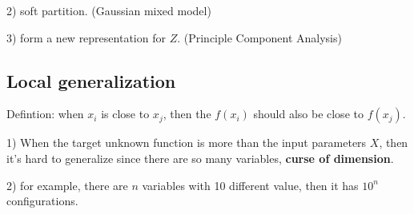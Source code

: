 \documentclass{article}
\begin{document}
2) soft partition. (Gaussian mixed model)

3) form a new representation for $Z$. (Principle Component Analysis)

\subsection{Local generalization}
Defintion: when $x_i$ is close to $x_j$, then the $f(x_i)$ should also be close to $f(x_j)$.

1) When the target unknown function is more than the input parameters $X$, then it's hard to generalize since there are so many variables, \textbf{curse of dimension}.

2) for example, there are $n$ variables with 10 different value, then it has $10^{n}$ configurations.
\end{document}
